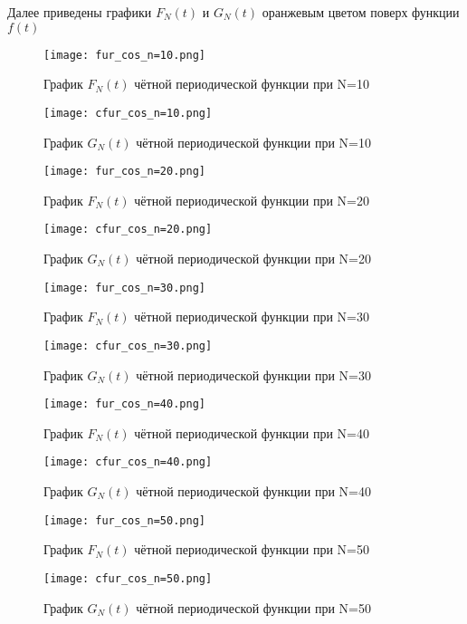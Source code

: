 \documentclass[a4paper, 16pt]{article}
\begin{document}
\noindent Далее приведены графики $F_N(t)$ и $G_N(t)$ оранжевым цветом поверх функции $f(t)$
\newpage
\vspace*{10mm}
\begin{figure}[!htb]
    \centering
    \texttt{[image: fur\_cos\_n=10.png]}
    \captionsetup{skip=0pt}
    \caption{График $F_N(t)$ чётной периодической функции при N=10}
    \label{Рис:13}
\end{figure}
\begin{figure}[!htb]
    \centering
    \texttt{[image: cfur\_cos\_n=10.png]}
    \captionsetup{skip=0pt}
    \caption{График $G_N(t)$ чётной периодической функции при N=10}
    \label{Рис:14}
\end{figure}
\newpage
\vspace*{10mm}
\begin{figure}[!htb]
    \centering
    \texttt{[image: fur\_cos\_n=20.png]}
    \captionsetup{skip=0pt}
    \caption{График $F_N(t)$ чётной периодической функции при N=20}
    \label{Рис:15}
\end{figure}
\begin{figure}[!htb]
    \centering
    \texttt{[image: cfur\_cos\_n=20.png]}
    \captionsetup{skip=0pt}
    \caption{График $G_N(t)$ чётной периодической функции при N=20}
    \label{Рис:16}
\end{figure}
\newpage
\vspace*{10mm}
\begin{figure}[!htb]
    \centering
    \texttt{[image: fur\_cos\_n=30.png]}
    \captionsetup{skip=0pt}
    \caption{График $F_N(t)$ чётной периодической функции при N=30}
    \label{Рис:17}
\end{figure}
\begin{figure}[!htb]
    \centering
    \texttt{[image: cfur\_cos\_n=30.png]}
    \captionsetup{skip=0pt}
    \caption{График $G_N(t)$ чётной периодической функции при N=30}
    \label{Рис:18}
\end{figure}
\newpage
\vspace*{10mm}
\begin{figure}[!htb]
    \centering
    \texttt{[image: fur\_cos\_n=40.png]}
    \captionsetup{skip=0pt}
    \caption{График $F_N(t)$ чётной периодической функции при N=40}
    \label{Рис:19}
\end{figure}
\begin{figure}[!htb]
    \centering
    \texttt{[image: cfur\_cos\_n=40.png]}
    \captionsetup{skip=0pt}
    \caption{График $G_N(t)$ чётной периодической функции при N=40}
    \label{Рис:20}
\end{figure}
\newpage
\begin{figure}[!htb]
    \centering
    \texttt{[image: fur\_cos\_n=50.png]}
    \captionsetup{skip=0pt}
    \caption{График $F_N(t)$ чётной периодической функции при N=50}
    \label{Рис:21}
\end{figure}
\begin{figure}[!htb]
    \centering
    \texttt{[image: cfur\_cos\_n=50.png]}
    \captionsetup{skip=0pt}
    \caption{График $G_N(t)$ чётной периодической функции при N=50}
    \label{Рис:22}
\end{figure}
\end{document}
